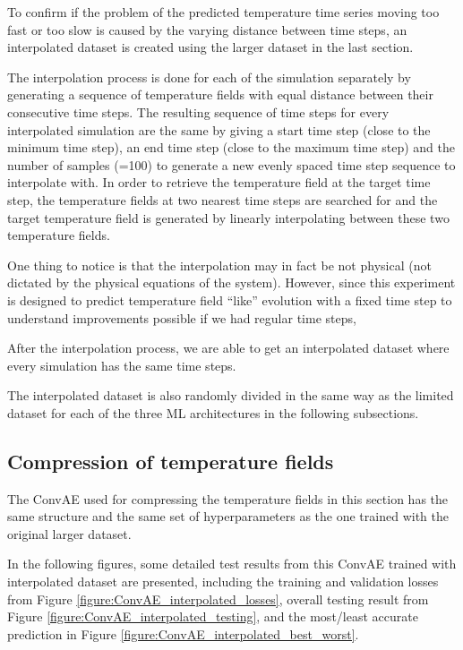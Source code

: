 To confirm if the problem of the predicted temperature time series moving too fast or too slow is caused by the varying distance between time steps, an interpolated dataset is created using the larger dataset in the last section.

The interpolation process is done for each of the simulation separately by generating a sequence of temperature fields with equal distance between their consecutive time steps. The resulting sequence of time steps for every interpolated simulation are the same by giving a start time step (close to the minimum time step), an end time step (close to the maximum time step) and the number of samples (=100) to generate a new evenly spaced time step sequence to interpolate with. In order to retrieve the temperature field at the target time step, the temperature fields at two nearest time steps are searched for and the target temperature field is generated by linearly interpolating between these two temperature fields.

One thing to notice is that the interpolation may in fact be not physical (not dictated by the physical equations of the system). However, since this experiment is designed to predict temperature field ``like'' evolution with a fixed time step to understand improvements possible if we had regular time steps, 

After the interpolation process, we are able to get an interpolated dataset where every simulation has the same time steps.

The interpolated dataset is also randomly divided in the same way as the limited dataset for each of the three ML architectures in the following subsections.


\subsection{Compression of temperature fields}

The ConvAE used for compressing the temperature fields in this section has the same structure and the same set of hyperparameters as the one trained with the original larger dataset.

In the following figures, some detailed test results from this ConvAE trained with interpolated dataset are presented, including the training and validation losses from Figure \ref{figure:ConvAE_interpolated_losses}, overall testing result from Figure \ref{figure:ConvAE_interpolated_testing}, and the most/least accurate prediction in Figure \ref{figure:ConvAE_interpolated_best_worst}.



